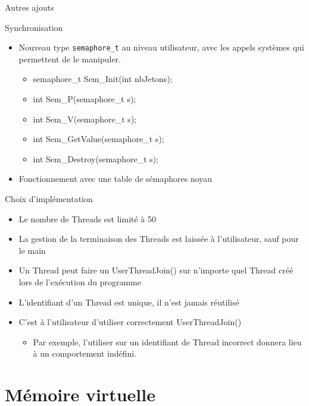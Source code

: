 \documentclass{beamer}
\begin{document}
\begin{frame}{Autres ajouts}
	\begin{block}{Synchronisation }
		\begin{itemize}
			\item<1-> Nouveau type \texttt{semaphore\_t} au niveau utilisateur, avec les appels systèmes qui permettent de le manipuler.
			\begin{itemize}
				\item<2-> semaphore\_t Sem\_Init(int nbJetons);
				\item<3-> int Sem\_P(semaphore\_t s);
				\item<4-> int Sem\_V(semaphore\_t s);
				\item<5-> int Sem\_GetValue(semaphore\_t s);
				\item<6-> int Sem\_Destroy(semaphore\_t s);
			\end{itemize}
			\item<7-> Fonctionnement avec une table de sémaphores noyau
		\end{itemize}
	\end{block}
\end{frame}

\begin{frame}
	\begin{block}{Choix d’implémentation }
		\begin{itemize}[<+->]
			\item Le nombre de Threads est limité à 50 
			\item La gestion de la terminaison des Threads est laissée à l'utilisateur, sauf pour le main
			\item Un Thread peut faire un UserThreadJoin() sur n'importe quel Thread créé lors de l'exécution du programme
			\item L'identifiant d'un Thread est unique, il n'est jamais réutilisé
			\item C'est à l'utilisateur d'utiliser correctement UserThreadJoin() 
			\begin{itemize}
				\item Par exemple, l'utiliser sur un identifiant de Thread incorrect donnera lieu à un comportement indéfini.
			\end{itemize}			
		\end{itemize}
	\end{block}
\end{frame}

\section{Mémoire virtuelle}
\end{document}
